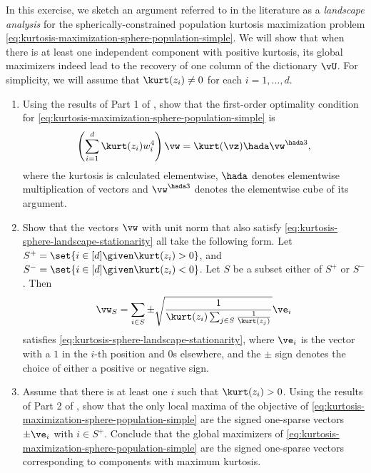 \documentclass[../../book-main.tex]{subfiles}
\begin{document}
\begin{exercise}\label{exercise:kurtosis-sphere-landscape}
    In this exercise, we sketch an argument referred to in the literature as a \textit{landscape analysis} for the spherically-constrained population kurtosis maximization problem \eqref{eq:kurtosis-maximization-sphere-population-simple}. We will show that when there is at least one independent component with positive kurtosis, its 
    global maximizers indeed lead to the recovery of one column of the dictionary $\vU$.
    For simplicity, we will assume that $\kurt(z_i) \neq 0$ for each $i = 1, \dots, d$.
    \begin{enumerate}
        \item Using the results of Part 1 of , 
        show that the first-order optimality condition for \eqref{eq:kurtosis-maximization-sphere-population-simple} is
        \begin{equation}\label{eq:kurtosis-sphere-landscape-stationarity}
            \left(\sum_{i=1}^d \kurt(z_i) w_i^4 \right) 
            \vw = \kurt(\vz) \hada \vw^{\hada 3}, 
        \end{equation}
        where the kurtosis is calculated elementwise, $\hada$ denotes elementwise multiplication of vectors and $\vw^{\hada 3}$ denotes the elementwise cube of its argument.
        \item Show that the vectors $\vw$ with unit norm that also satisfy \eqref{eq:kurtosis-sphere-landscape-stationarity}
        all take the following form.
        Let $S^+ = \set{i \in [d] \given \kurt(z_i) > 0}$, and 
        $S^- = \set{i \in [d] \given \kurt(z_i) < 0}$.
        Let $S$ be a subset either of $S^+$ or $S^-$.
        Then 
        \begin{equation}\label{eq:kurtosis-sphere-landscape-cps}
            \vw_S = \sum_{i \in S} \pm \sqrt{\frac{1}{\kurt(z_i) \sum_{j \in S} \frac{1}{\kurt(z_j)}}} \ve_i
        \end{equation}
        satisfies \eqref{eq:kurtosis-sphere-landscape-stationarity},
        where $\ve_i$ is the vector with a $1$ in the $i$-th position and $0$s elsewhere, and the $\pm$ sign denotes the choice of either a positive or negative sign.
        \item Assume that there is at least one $i$ such that $\kurt(z_i) > 0$. Using the results of Part 2 of , show that the only local maxima of the objective of \eqref{eq:kurtosis-maximization-sphere-population-simple} are the signed one-sparse vectors $\pm \ve_i$ with $i \in S^+$. Conclude that the global maximizers of \eqref{eq:kurtosis-maximization-sphere-population-simple} are the signed one-sparse vectors corresponding to components with maximum kurtosis. %

\end{enumerate}
\end{exercise}
\end{document}

